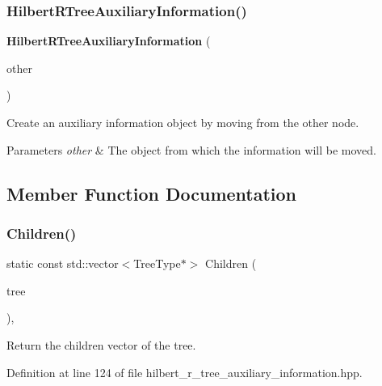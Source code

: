 \subsubsection{Hilbert\+R\+Tree\+Auxiliary\+Information()\hspace{0.1cm}{\footnotesize\ttfamily [4/4]}}
{\footnotesize\ttfamily \textbf{ Hilbert\+R\+Tree\+Auxiliary\+Information} (\begin{DoxyParamCaption}\item[{\textbf{ Hilbert\+R\+Tree\+Auxiliary\+Information}$<$ Tree\+Type, Hilbert\+Value\+Type $>$ \&\&}]{other }\end{DoxyParamCaption})}



Create an auxiliary information object by moving from the other node. 


\begin{DoxyParams}{Parameters}
{\em other} & The object from which the information will be moved. \\
\hline
\end{DoxyParams}


\subsection{Member Function Documentation}
\mbox{\label{classmlpack_1_1tree_1_1HilbertRTreeAuxiliaryInformation_ae7985642e74393bc9e2e24abdfbffc02}} 
\subsubsection{Children()}
{\footnotesize\ttfamily static const std\+::vector$<$Tree\+Type$\ast$$>$ Children (\begin{DoxyParamCaption}\item[{const Tree\+Type $\ast$}]{tree }\end{DoxyParamCaption})\hspace{0.3cm}{\ttfamily [inline]}, {\ttfamily [static]}}



Return the children vector of the tree. 



Definition at line 124 of file hilbert\+\_\+r\+\_\+tree\+\_\+auxiliary\+\_\+information.\+hpp.

